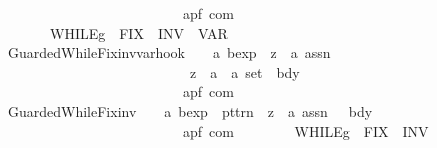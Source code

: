\begin{isabellebody}
\ \ \ \ \ \ \ \ \ \ \ \ \ \ \ \ \ \ \ \ \ \ \ \ \ \ {\isasymRightarrow}\ {\isacharparenleft}{\isacharprime}a{\isacharcomma}{\isacharprime}p{\isacharcomma}{\isacharprime}f{\isacharparenright}\ com{\isachardoublequoteclose}\isanewline
\ \ \ \ \ \ \ \ {\isacharparenleft}{\isachardoublequoteopen}{\isacharparenleft}{}WHILE\isactrlsub g\ {\isacharparenleft}{\isacharunderscore}{\isacharparenright}{\isacharslash}\ FIX\ {\isacharunderscore}{\isachardot}{\isacharslash}\ INV\ {\isacharparenleft}{\isacharunderscore}{\isacharparenright}{\isacharslash}\ VAR\ {\isacharparenleft}{\isacharunderscore}{\isacharparenright}\ {\isacharslash}{\isacharunderscore}{\isacharparenright}{\isachardoublequoteclose}\ \ {\isacharbrackleft}{}{}{\isacharcomma}\ {}{\isacharcomma}\ {}{\isacharcomma}\ {}{\isacharcomma}\ {}{}{\isacharbrackright}\ {}{}{\isacharparenright}\isanewline
\ \ {\isachardoublequoteopen}{\isacharunderscore}GuardedWhileFix{\isacharunderscore}inv{\isacharunderscore}var{\isacharunderscore}hook{\isachardoublequoteclose}\ \ \ {\isacharcolon}{\isacharcolon}\ {\isachardoublequoteopen}{\isacharprime}a\ bexp\ {\isasymRightarrow}\ {\isacharparenleft}{\isacharprime}z\ {\isasymRightarrow}\ {\isacharprime}a\ assn{\isacharparenright}\ \ {\isasymRightarrow}\ \isanewline
\ \ \ \ \ \ \ \ \ \ \ \ \ \ \ \ \ \ \ \ \ \ \ \ \ \ \ \ {\isacharparenleft}{\isacharprime}z\ {\isasymRightarrow}\ {\isacharparenleft}{\isacharprime}a\ {\isasymtimes}\ {\isacharprime}a{\isacharparenright}\ set{\isacharparenright}\ {\isasymRightarrow}\ bdy\ \isanewline
\ \ \ \ \ \ \ \ \ \ \ \ \ \ \ \ \ \ \ \ \ \ \ \ \ \ {\isasymRightarrow}\ {\isacharparenleft}{\isacharprime}a{\isacharcomma}{\isacharprime}p{\isacharcomma}{\isacharprime}f{\isacharparenright}\ com{\isachardoublequoteclose}\isanewline
\ \ {\isachardoublequoteopen}{\isacharunderscore}GuardedWhileFix{\isacharunderscore}inv{\isachardoublequoteclose}\ \ \ {\isacharcolon}{\isacharcolon}\ {\isachardoublequoteopen}{\isacharprime}a\ bexp\ {\isacharequal}{\isachargreater}\ pttrn\ {\isasymRightarrow}\ {\isacharparenleft}{\isacharprime}z\ {\isasymRightarrow}\ {\isacharprime}a\ assn{\isacharparenright}\ \ {\isasymRightarrow}\ bdy\ \isanewline
\ \ \ \ \ \ \ \ \ \ \ \ \ \ \ \ \ \ \ \ \ \ \ \ \ \ {\isasymRightarrow}\ {\isacharparenleft}{\isacharprime}a{\isacharcomma}{\isacharprime}p{\isacharcomma}{\isacharprime}f{\isacharparenright}\ com{\isachardoublequoteclose}\isanewline
\ \ \ \ \ \ \ \ {\isacharparenleft}{\isachardoublequoteopen}{\isacharparenleft}{}WHILE\isactrlsub g\ {\isacharparenleft}{\isacharunderscore}{\isacharparenright}{\isacharslash}\ FIX\ {\isacharunderscore}{\isachardot}{\isacharslash}\ INV\ {\isacharparenleft}{\isacharunderscore}{\isacharparenright}{\isacharslash}{\isacharunderscore}{\isacharparenright}{\isachardoublequoteclose}\ \ {\isacharbrackleft}{}{}{\isacharcomma}\ {}{\isacharcomma}\ {}{\isacharcomma}\ {}{}{\isacharbrackright}\ {}{}{\isacharparenright}\isanewline

\end{isabellebody}
